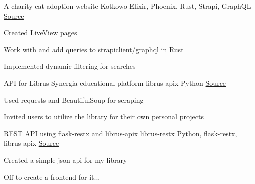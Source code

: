 

\begin{cventries}

  \cventry
    { A charity cat adoption website } %
    {Kotkowo} %
    {Elixir, Phoenix, Rust, Strapi, GraphQL} %
    {\href{https://github.com/kotkowo/kotkowo}{\faGithubSquare\acvHeaderIconSep Source}} %
    {
      \begin{cvitems} %
        \item {Created LiveView pages}
        \item {Work with and add queries to strapiclient/graphql in Rust}
        \item {Implemented dynamic filtering for searches}
      \end{cvitems}
    } %
  \cventry
    {API for Librus Synergia educational platform} %
    {librus-apix} %
    {Python} %
    {\href{https://github.com/rustysnek/librus-apix}{\faGithubSquare\acvHeaderIconSep Source}} %
    {
      \begin{cvitems} %
        \item {Used requests and BeautifulSoup for scraping}
        \item {Invited users to utilize the library for their own personal projects}
      \end{cvitems}
    } %


  \cventry
    {REST API using flask-restx and librus-apix} %
    {librus-restx} %
    {Python, flask-restx, librus-apix} %
    {\href{https://github.com/rustysnek/librus-restx}{\faGithubSquare\acvHeaderIconSep Source}} %
    {
      \begin{cvitems} %
        \item {Created a simple json api for my library}
        \item {Off to create a frontend for it...}
      \end{cvitems}
    } %


\end{cventries}
